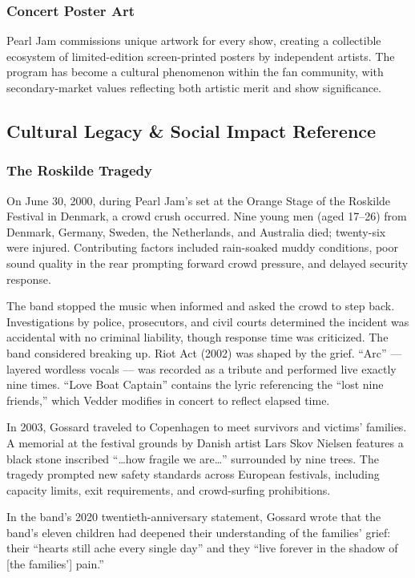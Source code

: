\documentclass[11pt,letterpaper]{article}
\begin{document}
\subsubsection{Concert Poster Art}

Pearl Jam commissions unique artwork for every show, creating a collectible ecosystem of limited-edition screen-printed posters by independent artists. The program has become a cultural phenomenon within the fan community, with secondary-market values reflecting both artistic merit and show significance.

\subsection{Cultural Legacy \& Social Impact Reference}

\subsubsection{The Roskilde Tragedy}

On June 30, 2000, during Pearl Jam's set at the Orange Stage of the Roskilde Festival in Denmark, a crowd crush occurred. Nine young men (aged 17--26) from Denmark, Germany, Sweden, the Netherlands, and Australia died; twenty-six were injured. Contributing factors included rain-soaked muddy conditions, poor sound quality in the rear prompting forward crowd pressure, and delayed security response.

The band stopped the music when informed and asked the crowd to step back. Investigations by police, prosecutors, and civil courts determined the incident was accidental with no criminal liability, though response time was criticized. The band considered breaking up. Riot Act (2002) was shaped by the grief. ``Arc'' --- layered wordless vocals --- was recorded as a tribute and performed live exactly nine times. ``Love Boat Captain'' contains the lyric referencing the ``lost nine friends,'' which Vedder modifies in concert to reflect elapsed time.

In 2003, Gossard traveled to Copenhagen to meet survivors and victims' families. A memorial at the festival grounds by Danish artist Lars Skov Nielsen features a black stone inscribed ``\ldots how fragile we are\ldots'' surrounded by nine trees. The tragedy prompted new safety standards across European festivals, including capacity limits, exit requirements, and crowd-surfing prohibitions.

In the band's 2020 twentieth-anniversary statement, Gossard wrote that the band's eleven children had deepened their understanding of the families' grief: their ``hearts still ache every single day'' and they ``live forever in the shadow of [the families'] pain.''
\end{document}
